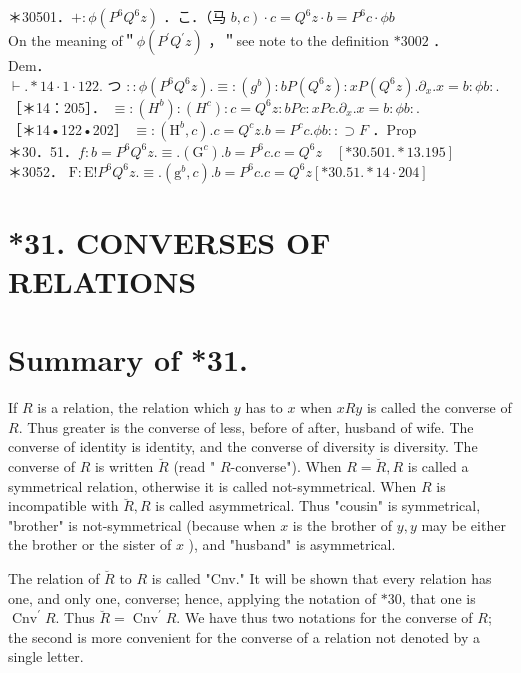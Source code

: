 \documentclass[10pt]{article}
\begin{document}
＊30501．$+: \phi\left(P^{6} Q^{6} z\right)$ ．こ．（马 $\left.b, c\right) \cdot c=Q^{6} z \cdot b=P^{6} c \cdot \phi b$\\
On the meaning of＂$\phi\left(P^{\prime} Q^{\prime} z\right)$ ，＂see note to the definition $* 3002$ ．\\
Dem．\\
$\vdash . * 14 \cdot 1 \cdot 122$. つ $:: \phi\left(P^{6} Q^{6} z\right) . \equiv:\left(g^{b}\right): b P\left(Q^{6} z\right): x P\left(Q^{6} z\right) . \partial_{x} . x=b: \phi b:$.\\
［＊14：205］． $\equiv:\left(H^{b}\right):\left(H^{c}\right): c=Q^{6} z: b P c: x P c . \partial_{x} . x=b: \phi b:$.\\
［＊14•122•202］ $\equiv:\left(\mathrm{H}^{b}, c\right) . c=Q^{c} z . b=P^{c} c . \phi b:: \supset F$ ．Prop\\
＊30．51．$f: b=P^{6} Q^{6} z . \equiv .\left(\mathrm{G}^{c}\right) . b=P^{6} c . c=Q^{6} z \quad[* 30.501 . * 13.195]$\\
＊3052． $\mathrm{F}: \mathrm{E}!P^{6} Q^{6} z . \equiv .\left(\mathrm{g}^{b}, c\right) . b=P^{6} c . c=Q^{6} z[* 30.51 . * 14 \cdot 204]$

\section*{*31. CONVERSES OF RELATIONS}
\section*{Summary of *31.}
If $R$ is a relation, the relation which $y$ has to $x$ when $x R y$ is called the converse of $R$. Thus greater is the converse of less, before of after, husband of wife. The converse of identity is identity, and the converse of diversity is diversity. The converse of $R$ is written $\breve{R}$ (read " $R$-converse"). When $R=\breve{R}, R$ is called a symmetrical relation, otherwise it is called not-symmetrical. When $R$ is incompatible with $\breve{R}, R$ is called asymmetrical. Thus "cousin" is symmetrical, "brother" is not-symmetrical (because when $x$ is the brother of $y, y$ may be either the brother or the sister of $x$ ), and "husband" is asymmetrical.

The relation of $\breve{R}$ to $R$ is called "Cnv." It will be shown that every relation has one, and only one, converse; hence, applying the notation of $* 30$, that one is $\operatorname{Cnv}^{\prime} R$. Thus $\breve{R}=\operatorname{Cnv}^{\prime} R$. We have thus two notations for the converse of $R$; the second is more convenient for the converse of a relation not denoted by a single letter.
\end{document}
